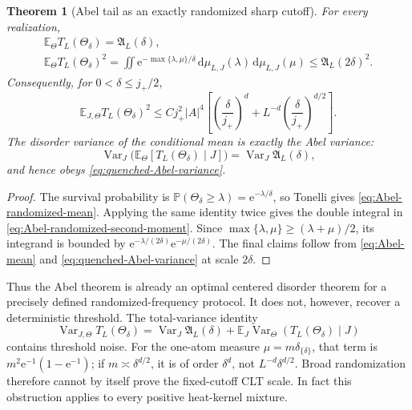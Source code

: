 \documentclass[11pt]{article}
\newtheorem{theorem}{Theorem}[section]
\theoremstyle{definition}
\theoremstyle{remark}
\newcommand{\e}{\mathrm e}
\newcommand{\E}{\mathbb E}
\newcommand{\Prob}{\mathbb P}
\newcommand{\Var}{\operatorname{Var}}
\newcommand{\abs}[1]{\left\lvert #1\right\rvert}
\newcommand{\dd}{\,\mathrm d}
\begin{document}
\begin{theorem}[Abel tail as an exactly randomized sharp cutoff]
\label{thm:exponential-random-cutoff}
For every realization,
\begin{align}
 \boxed{\E_\Theta T_L(\Theta_\delta)=\mathfrak A_L(\delta),}
 \label{eq:Abel-randomized-mean}\\
 \boxed{
 \E_\Theta T_L(\Theta_\delta)^2
 =\iint\e^{-\max\{\lambda,\mu\}/\delta}
 \dd\mu_{L,J}(\lambda)\dd\mu_{L,J}(\mu)
 \le\mathfrak A_L(2\delta)^2.}
 \label{eq:Abel-randomized-second-moment}
\end{align}
Consequently, for $0<\delta\le j_+/2$,
\begin{equation}
 \E_{J,\Theta}T_L(\Theta_\delta)^2
 \le Cj_+^2\abs A^4\left[
 \left(\frac\delta{j_+}\right)^d
 +L^{-d}\left(\frac\delta{j_+}\right)^{d/2}
 \right].
 \label{eq:randomized-sharp-second-moment}
\end{equation}
The disorder variance of the conditional mean is exactly the Abel variance:
\begin{equation}
 \Var_J\bigl(\E_\Theta[T_L(\Theta_\delta)\mid J]\bigr)
 =\Var_J\mathfrak A_L(\delta),
 \label{eq:randomized-conditional-variance}
\end{equation}
and hence obeys \eqref{eq:quenched-Abel-variance}.
\end{theorem}

\begin{proof}
The survival probability is
$\Prob(\Theta_\delta\ge\lambda)=\e^{-\lambda/\delta}$, so Tonelli gives
\eqref{eq:Abel-randomized-mean}.  Applying the same identity twice gives the
double integral in \eqref{eq:Abel-randomized-second-moment}.  Since
$\max\{\lambda,\mu\}\ge(\lambda+\mu)/2$, its integrand is bounded by
$\e^{-\lambda/(2\delta)}\e^{-\mu/(2\delta)}$.  The final claims follow from
\eqref{eq:Abel-mean} and \eqref{eq:quenched-Abel-variance} at scale $2\delta$.
\end{proof}

Thus the Abel theorem is already an optimal centered disorder theorem for a
precisely defined randomized-frequency protocol.  It does not, however,
recover a deterministic threshold.  The total-variance identity
\begin{equation}
 \Var_{J,\Theta}T_L(\Theta_\delta)
 =\Var_J\mathfrak A_L(\delta)
 +\E_J\Var_\Theta(T_L(\Theta_\delta)\mid J)
 \label{eq:randomized-total-variance}
\end{equation}
contains threshold noise.  For the one-atom measure
$\mu=m\delta_{\{\delta\}}$, that term is
$m^2\e^{-1}(1-\e^{-1})$; if $m\asymp\delta^{d/2}$, it is of order
$\delta^d$, not $L^{-d}\delta^{d/2}$.  Broad randomization therefore cannot
by itself prove the fixed-cutoff CLT scale.  In fact this obstruction applies
to every positive heat-kernel mixture.
\end{document}
